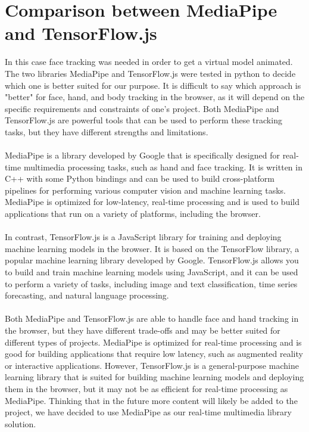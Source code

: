 \section{Comparison between MediaPipe and TensorFlow.js}
In this case face tracking was needed in order to get a virtual model animated. The two libraries MediaPipe and TensorFlow.js were tested in python to decide which one is better suited for our purpose. It is difficult to say which approach is "better" for face, hand, and body tracking in the browser, as it will depend on the specific requirements and constraints of one's project. Both MediaPipe and TensorFlow.js are powerful tools that can be used to perform these tracking tasks, but they have different strengths and limitations.
\\
\\
MediaPipe is a library developed by Google that is specifically designed for real-time multimedia processing tasks, such as hand and face tracking. It is written in C++ with some Python bindings and can be used to build cross-platform pipelines for performing various computer vision and machine learning tasks. MediaPipe is optimized for low-latency, real-time processing and is used to build applications that run on a variety of platforms, including the browser.
\\
\\
In contrast, TensorFlow.js is a JavaScript library for training and deploying machine learning models in the browser. It is based on the TensorFlow library, a popular machine learning library developed by Google. TensorFlow.js allows you to build and train machine learning models using JavaScript, and it can be used to perform a variety of tasks, including image and text classification, time series forecasting, and natural language processing.
\\
\\
Both MediaPipe and TensorFlow.js are able to handle face and hand tracking in the browser, but they have different trade-offs and may be better suited for different types of projects. MediaPipe is optimized for real-time processing and is good for building applications that require low latency, such as augmented reality or interactive applications. However, TensorFlow.js is a general-purpose machine learning library that is suited for building machine learning models and deploying them in the browser, but it may not be as efficient for real-time processing as MediaPipe. Thinking that in the future more content will likely be added to the project, we have decided to use MediaPipe as our real-time multimedia library solution.


